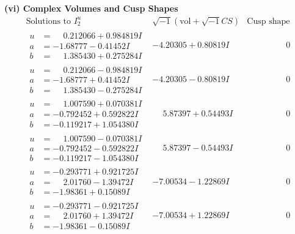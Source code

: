 \documentclass[1p]{elsarticle_modified}
\theoremstyle{definition}
\newcommand{\I}{\sqrt{-1}}
\begin{document}
\newpage\flushleft \textbf{(vi) Complex Volumes and Cusp Shapes}
$$\begin{array}{c|c|c}  
\text{Solutions to }I^u_{2}& \I (\text{vol} + \sqrt{-1}CS) & \text{Cusp shape}\\
 \hline 
\begin{aligned}
u &= \phantom{-}0.212066 + 0.984819 I \\
a &= -1.68777 - 0.41452 I \\
b &= \phantom{-}1.385430 + 0.275284 I\end{aligned}
 & -4.20305 + 0.80819 I & \phantom{-0.000000 } 0 \\ \hline\begin{aligned}
u &= \phantom{-}0.212066 - 0.984819 I \\
a &= -1.68777 + 0.41452 I \\
b &= \phantom{-}1.385430 - 0.275284 I\end{aligned}
 & -4.20305 - 0.80819 I & \phantom{-0.000000 } 0 \\ \hline\begin{aligned}
u &= \phantom{-}1.007590 + 0.070381 I \\
a &= -0.792452 + 0.592822 I \\
b &= -0.119217 + 1.054380 I\end{aligned}
 & \phantom{-}5.87397 + 0.54493 I & \phantom{-0.000000 } 0 \\ \hline\begin{aligned}
u &= \phantom{-}1.007590 - 0.070381 I \\
a &= -0.792452 - 0.592822 I \\
b &= -0.119217 - 1.054380 I\end{aligned}
 & \phantom{-}5.87397 - 0.54493 I & \phantom{-0.000000 } 0 \\ \hline\begin{aligned}
u &= -0.293771 + 0.921725 I \\
a &= \phantom{-}2.01760 - 1.39472 I \\
b &= -1.98361 + 0.15089 I\end{aligned}
 & -7.00534 - 1.22869 I & \phantom{-0.000000 } 0 \\ \hline\begin{aligned}
u &= -0.293771 - 0.921725 I \\
a &= \phantom{-}2.01760 + 1.39472 I \\
b &= -1.98361 - 0.15089 I\end{aligned}
 & -7.00534 + 1.22869 I & \phantom{-0.000000 } 0 \\ \hline\begin{aligned}

\end{aligned}
\end{array}$$
\end{document}
